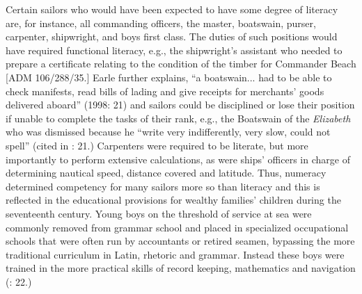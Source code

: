 Certain sailors who would have been expected to have some degree of literacy are, for instance, all commanding officers, the master, boatswain, purser, carpenter, shipwright, and boys first class. The duties of such positions would have required functional literacy, e.g., the shipwright’s assistant who needed to prepare a certificate relating to the condition of the timber for Commander Beach [ADM 106/288/35.] Earle further explains, “a boatswain... had to be able to check manifests, read bills of lading and give receipts for merchants’ goods delivered aboard” (1998: 21) and sailors could be disciplined or lose their position if unable to complete the tasks of their rank, e.g., the Boatswain of the \textit{Elizabeth} who was dismissed because he “write very indifferently, very slow, could not spell” (cited in \citealt{Earle1998}: 21.) Carpenters were required to be literate, but more importantly to perform extensive calculations, as were ships’ officers in charge of determining nautical speed, distance covered and latitude. Thus, numeracy determined competency for many sailors more so than literacy and this is reflected in the educational provisions for wealthy families’ children during the seventeenth century. Young boys on the threshold of service at sea were commonly removed from grammar school and placed in specialized occupational schools that were often run by accountants or retired seamen, bypassing the more traditional curriculum in Latin, rhetoric and grammar.  Instead these boys were trained in the more practical skills of record keeping, mathematics and navigation (\citealt{Earle1998}: 22.) 

